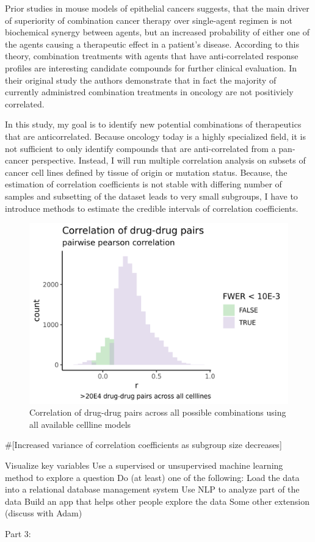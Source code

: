 \documentclass[]{article}
\begin{document}
Prior studies in mouse models of epithelial cancers suggests, that the
main driver of superiority of combination cancer therapy over
single-agent regimen is not biochemical synergy between agents, but an
increased probability of either one of the agents causing a therapeutic
effect in a patient's disease. According to this theory, combination
treatments with agents that have anti-correlated response profiles are
interesting candidate compounds for further clinical evaluation. In
their original study the authors demonstrate that in fact the majority
of currently administred combination treatments in oncology are not
positiviely correlated.

In this study, my goal is to identify new potential combinations of
therapeutics that are anticorrelated. Because oncology today is a highly
specialized field, it is not sufficient to only identify compounds that
are anti-correlated from a pan-cancer perspective. Instead, I will run
multiple correlation analysis on subsets of cancer cell lines defined by
tissue of origin or mutation status. Because, the estimation of
correlation coefficients is not stable with differing number of samples
and subsetting of the dataset leads to very small subgroups, I have to
introduce methods to estimate the credible intervals of correlation
coefficients.

\begin{figure}
\centering
\includegraphics{pan_cancer_r_hist.png}
\caption{Correlation of drug-drug pairs across all possible combinations
using all available cellline models}
\end{figure}

\#{[}Increased variance of correlation coefficients as subgroup size
decreases{]}

Visualize key variables Use a supervised or unsupervised machine
learning method to explore a question Do (at least) one of the
following: Load the data into a relational database management system
Use NLP to analyze part of the data Build an app that helps other people
explore the data Some other extension (discuss with Adam)

Part 3:
\end{document}
